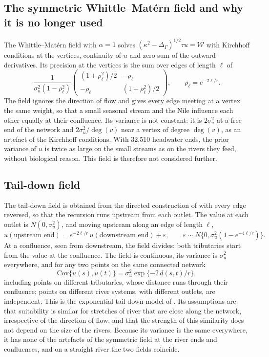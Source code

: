 \documentclass[11pt,a4paper]{article}
\newcommand{\Cov}{\mathrm{Cov}}
\begin{document}
\subsection*{The symmetric Whittle--Mat\'ern field and why it is no longer used}

The Whittle--Mat\'ern field with $\alpha = 1$ \citep{bolin2024} solves $(\kappa^2 - \Delta_\Gamma)^{1/2}\tau u = \mathcal{W}$ with Kirchhoff conditions at the vertices, continuity of $u$ and zero sum of the outward derivatives. Its precision at the vertices is the sum over edges of length $\ell$ of
\[
\frac{1}{\sigma_u^2(1 - \rho_\ell^2)}\begin{pmatrix} (1 + \rho_\ell^2)/2 & -\rho_\ell \\ -\rho_\ell & (1 + \rho_\ell^2)/2 \end{pmatrix}, \qquad \rho_\ell = e^{-2\ell/r}.
\]
The field ignores the direction of flow and gives every edge meeting at a vertex the same weight, so that a small seasonal stream and the Nile influence each other equally at their confluence. Its variance is not constant: it is $2\sigma_u^2$ at a free end of the network and $2\sigma_u^2/\deg(v)$ near a vertex of degree $\deg(v)$, as an artefact of the Kirchhoff conditions. With 32{,}510 headwater ends, the prior variance of $u$ is twice as large on the small streams as on the rivers they feed, without biological reason. This field is therefore not considered further.

\subsection*{Tail-down field}

The tail-down field is obtained from the directed construction of \citet{bolin2026dir} with every edge reversed, so that the recursion runs upstream from each outlet. The value at each outlet is $N(0, \sigma_u^2)$, and moving upstream along an edge of length $\ell$,
\[
u(\text{upstream end}) = e^{-2\ell/r}\, u(\text{downstream end}) + \varepsilon, \qquad \varepsilon \sim N\{0, \sigma_u^2(1 - e^{-4\ell/r})\}.
\]
At a confluence, seen from downstream, the field divides: both tributaries start from the value at the confluence. The field is continuous, its variance is $\sigma_u^2$ everywhere, and for any two points on the same connected network
\[
\Cov\{u(s), u(t)\} = \sigma_u^2 \exp\{-2\,d(s, t)/r\},
\]
including points on different tributaries, whose distance runs through their confluence; points on different river systems, with different outlets, are independent. This is the exponential tail-down model of \citet{verhoef2010}. Its assumptions are that suitability is similar for stretches of river that are close along the network, irrespective of the direction of flow, and that the strength of this similarity does not depend on the size of the rivers. Because its variance is the same everywhere, it has none of the artefacts of the symmetric field at the river ends and confluences, and on a straight river the two fields coincide.
\end{document}
